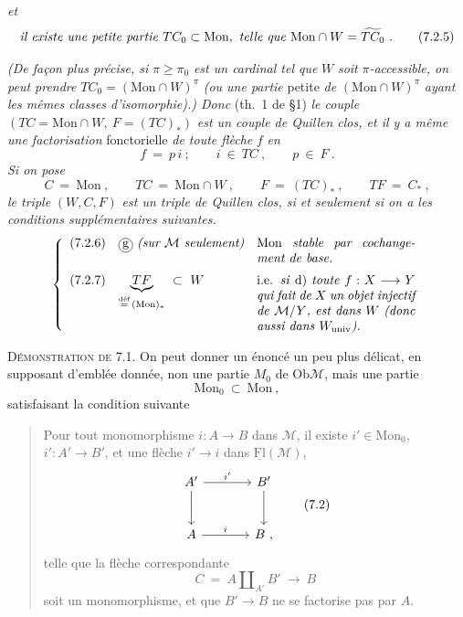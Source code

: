 \documentclass[11pt]{article}
\newcommand{\printedpage}[1]{\marginpar{\footnotesize p.~#1}}
\newcommand{\msp}[1]{\marginpar{\footnotesize [#1]}}
\newcommand{\Mon}{\mathrm{Mon}}
\newcommand{\Ob}{\mathrm{Ob}}
\newcommand{\Fl}{\mathrm{Fl}}
\newcommand{\cercle}[1]{\tikz[baseline=(c.base)]\node[draw,circle,inner sep=1pt](c){#1};}
\begin{document}
\printedpage{49}

\textit{et}
\[
\text{\textit{il existe une petite partie} } TC_0 \subset \Mon, \text{ \textit{telle que} } \Mon \cap W = \widetilde{TC_0}\ . \tag*{(7.2.5)} %
\]

\textit{(De façon plus précise, si} $\pi \geq \pi_0$ \textit{est un cardinal tel que} $W$ \textit{soit} $\pi$\textit{-accessible, on peut prendre} $TC_0 = (\Mon \cap W)^{\pi}$ \textit{(ou une partie} petite \textit{de} $(\Mon \cap W)^{\pi}$ \textit{ayant les mêmes classes d'isomorphie).) Donc} (th.~1 de §1) \textit{le couple} $(TC = \Mon \cap W,\ F = (TC)_*)$ \textit{est un couple de Quillen clos, et il y a même une factorisation} fonctorielle \textit{de toute flèche} $f$ \textit{en}
\[
f \ = \ p\, i \ ; \qquad i \ \in \ TC \ , \qquad p \ \in \ F \ . \tag*{(7.2.4)}
\]
\textit{Si on pose}
\[
C \ = \ \Mon \ , \qquad TC \ = \ \Mon \cap W \ , \qquad F \ = \ (TC)_* \ , \qquad TF \ = \ C_* \ , \tag*{(7.2.5)}
\]
\textit{le triple} $(W, C, F)$ \textit{est un triple de Quillen clos, si et seulement si on a les conditions supplémentaires suivantes.}
\[
\left\{
\begin{array}{lll}
\text{(7.2.6)} & \cercle{g}\ \text{\textit{(sur $\mathcal{M}$ seulement)}} & \parbox[t]{0.36\textwidth}{Mon \textit{stable par cochangement de base.}} \\[4ex]
\text{(7.2.7)} & \underbrace{TF}_{\overset{\text{déf}}{=}\,(\Mon)_*} \ \subset \ W & \parbox[t]{0.36\textwidth}{i.e. \textit{si} d) \textit{toute} $f : X \longrightarrow Y$ \textit{qui fait de} $X$ \textit{un objet injectif de} $\mathcal{M}/Y$\textit{, est dans} $W$ \textit{(donc aussi dans} $W_{\mathrm{univ}}$\textit{).}}
\end{array}
\right.
\]

\msp{page 90}

\textsc{Démonstration de} 7.1. On peut donner un énoncé un peu plus délicat, en supposant d'emblée donnée, non une partie $M_0$ de $\Ob \mathcal{M}$, mais une partie
\[
\Mon_0 \ \subset \ \Mon \ , \tag*{(7.1)}
\]
satisfaisant la condition suivante

\begin{quote}
Pour tout monomorphisme $i : A \longrightarrow B$ dans $\mathcal{M}$, il existe $i' \in \Mon_0$, $i' : A' \longrightarrow B'$, et une flèche $i' \longrightarrow i$ dans $\underline{\Fl}(\mathcal{M})$,
\[
\begin{tikzcd}[row sep=large, column sep=large]
A' \arrow[r, "{i'}"] \arrow[d] & B' \arrow[d] \\
A \arrow[r, "i"] & B \ ,
\end{tikzcd}
\tag*{(7.2)}
\]
telle que la flèche correspondante
\[
C \ = \ A \amalg_{A'} B' \ \longrightarrow \ B
\]
soit un monomorphisme, et que $B' \longrightarrow B$ ne se factorise pas par $A$.
\end{quote}
\end{document}
